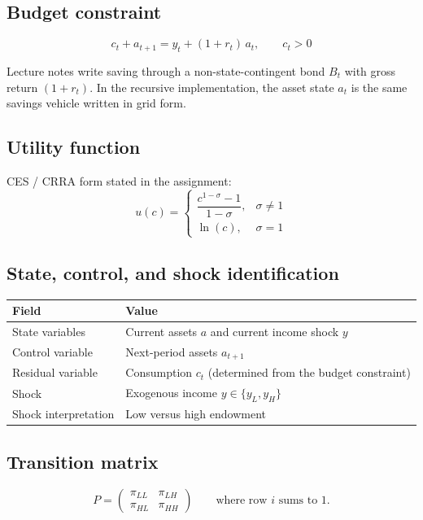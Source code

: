 \documentclass[11pt]{article}
\begin{document}
\subsection{Budget constraint}
\[
c_t + a_{t+1} = y_t + (1+r_t)\,a_t, \qquad c_t > 0
\]

\begin{notebox}
Lecture notes write saving through a non-state-contingent bond $B_t$ with gross return $(1+r_t)$. In the recursive implementation, the asset state $a_t$ is the same savings vehicle written in grid form.
\end{notebox}

\subsection{Utility function}
CES / CRRA form stated in the assignment:
\[
u(c) =
\begin{cases}
\dfrac{c^{1-\sigma}-1}{1-\sigma}, & \sigma \neq 1 \\[0.5em]
\ln(c), & \sigma = 1
\end{cases}
\]

\subsection{State, control, and shock identification}

\begin{tabularx}{\linewidth}{@{}lX@{}}
\toprule
\textbf{Field} & \textbf{Value} \\
\midrule
State variables & Current assets $a$ and current income shock $y$ \\
Control variable & Next-period assets $a_{t+1}$ \\
Residual variable & Consumption $c_t$ (determined from the budget constraint) \\
Shock & Exogenous income $y \in \{y_L, y_H\}$ \\
Shock interpretation & Low versus high endowment \\
\bottomrule
\end{tabularx}

\subsection{Transition matrix}

\[
P = \begin{pmatrix} \pi_{LL} & \pi_{LH} \\ \pi_{HL} & \pi_{HH} \end{pmatrix}
\qquad\text{where row } i \text{ sums to } 1.
\]
\end{document}
